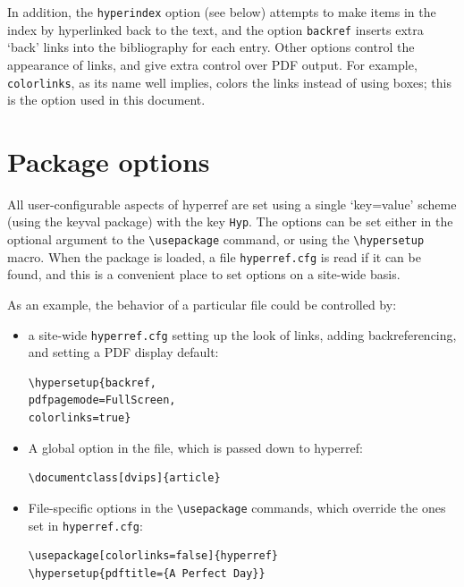 \documentclass[pdftex]{article}
\begin{document}
In addition, the \texttt{hyperindex} option (see below) attempts to make
items in the index by hyperlinked back to the text, and the option
\texttt{backref} inserts extra `back' links into the bibliography for
each entry. Other options control the appearance of links, and give
extra control over PDF output. For example, \texttt{colorlinks}, as its
name well implies, colors the links instead of using boxes; this is the
option used in this document.


\section{Package options}

All user-configurable aspects of \textsf{hyperref} are set using a
single `key=value' scheme (using the \textsf{keyval} package) with the
key \texttt{Hyp}. The options can be set either in the optional argument
to the \verb|\usepackage| command, or using the \verb|\hypersetup|
macro. When the package is loaded, a file \texttt{hyperref.cfg} is read
if it can be found, and this is a convenient place to set options on a
site-wide basis.

As an example, the behavior of a particular file could be controlled by:
\begin{itemize}

\item	a site-wide \texttt{hyperref.cfg} setting up the look of links,
adding backreferencing, and setting a PDF display default:

\begin{verbatim}
\hypersetup{backref,
pdfpagemode=FullScreen,
colorlinks=true}
\end{verbatim}

\item	A global option in the file, which is passed down to
\textsf{hyperref}:

\begin{verbatim}
\documentclass[dvips]{article}
\end{verbatim}

\item	File-specific options in the \verb|\usepackage| commands, which
override the ones set in \texttt{hyperref.cfg}:

\begin{verbatim}
\usepackage[colorlinks=false]{hyperref}
\hypersetup{pdftitle={A Perfect Day}}
\end{verbatim}
\end{itemize}
\end{document}
